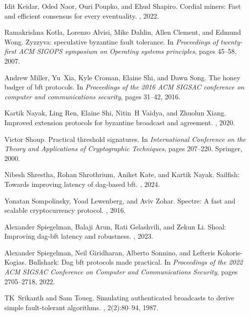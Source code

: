 \begin{thebibliography}{10}
Idit Keidar, Oded Naor, Ouri Poupko, and Ehud Shapiro.
\newblock Cordial miners: Fast and efficient consensus for every eventuality.
, 2022.

Ramakrishna Kotla, Lorenzo Alvisi, Mike Dahlin, Allen Clement, and Edmund Wong.
\newblock Zyzzyva: speculative byzantine fault tolerance.
\newblock In {\em Proceedings of twenty-first ACM SIGOPS symposium on Operating
  systems principles}, pages 45--58, 2007.

Andrew Miller, Yu~Xia, Kyle Croman, Elaine Shi, and Dawn Song.
\newblock The honey badger of bft protocols.
\newblock In {\em Proceedings of the 2016 ACM SIGSAC conference on computer and
  communications security}, pages 31--42, 2016.

Kartik Nayak, Ling Ren, Elaine Shi, Nitin~H Vaidya, and Zhuolun Xiang.
\newblock Improved extension protocols for byzantine broadcast and agreement.
, 2020.

Victor Shoup.
\newblock Practical threshold signatures.
\newblock In {\em International Conference on the Theory and Applications of
  Cryptographic Techniques}, pages 207--220. Springer, 2000.

Nibesh Shrestha, Rohan Shrothrium, Aniket Kate, and Kartik Nayak.
\newblock Sailfish: Towards improving latency of dag-based bft.
, 2024.

Yonatan Sompolinsky, Yoad Lewenberg, and Aviv Zohar.
\newblock Spectre: A fast and scalable cryptocurrency protocol.
, 2016.

Alexander Spiegelman, Balaji Arun, Rati Gelashvili, and Zekun Li.
\newblock Shoal: Improving dag-bft latency and robustness.
, 2023.

Alexander Spiegelman, Neil Giridharan, Alberto Sonnino, and Lefteris
  Kokoris-Kogias.
\newblock Bullshark: Dag bft protocols made practical.
\newblock In {\em Proceedings of the 2022 ACM SIGSAC Conference on Computer and
  Communications Security}, pages 2705--2718, 2022.

TK~Srikanth and Sam Toueg.
\newblock Simulating authenticated broadcasts to derive simple fault-tolerant
  algorithms.
, 2(2):80--94, 1987.


\end{thebibliography}
